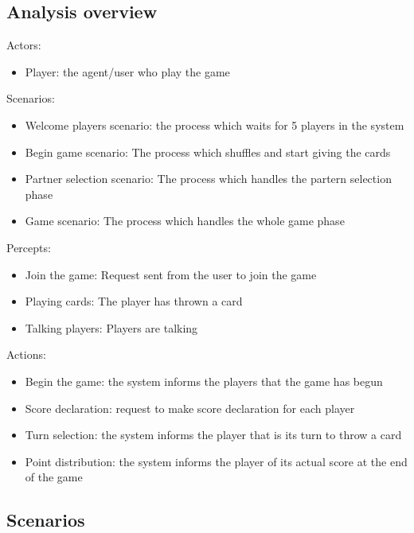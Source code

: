\documentclass[a4paper]{article}
\begin{document}
\subsection{Analysis overview}

Actors:
\begin{itemize}
  \item Player: the agent/user who play the game
\end{itemize}

Scenarios:
\begin{itemize}
  \item Welcome players scenario: the process which waits for 5 players in the system
  \item Begin game scenario: The process which shuffles and start giving the cards
  \item Partner selection scenario: The process which handles the partern selection phase
  \item Game scenario: The process which handles the whole game phase
\end{itemize}

Percepts:
\begin{itemize}
  \item Join the game: Request sent from the user to join the game
  \item Playing cards: The player has thrown a card
  \item Talking players:  Players are talking
\end{itemize}

Actions:
\begin{itemize}
  \item Begin the game: the system informs the players that the game has begun
  \item Score declaration: request to make score declaration for each player
  \item Turn selection: the system informs the player that is its turn to throw a card
  \item Point distribution: the system informs the player of its actual score at the end of the game
\end{itemize}


\subsection{Scenarios}
\end{document}
